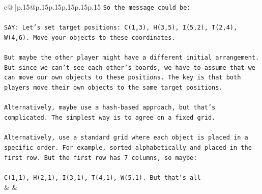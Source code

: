 \documentclass{article}
\begin{document}
{\begin{supertabular}{c@{$\;$}|p{.15\linewidth}@{}p{.15\linewidth}p{.15\linewidth}p{.15\linewidth}p{.15\linewidth}p{.15\linewidth}}
{{{\texttt{So the message could be:} \\
\\ 
\texttt{SAY: Let's set target positions: C(1,3), H(3,5), I(5,2), T(2,4), W(4,6). Move your objects to these coordinates.} \\
\\ 
\texttt{But maybe the other player might have a different initial arrangement. But since we can't see each other's boards, we have to assume that we can move our own objects to these positions. The key is that both players move their own objects to the same target positions.} \\
\\ 
\texttt{Alternatively, maybe use a hash{-}based approach, but that's complicated. The simplest way is to agree on a fixed grid.} \\
\\ 
\texttt{Alternatively, use a standard grid where each object is placed in a specific order. For example, sorted alphabetically and placed in the first row. But the first row has 7 columns, so maybe:} \\
\\ 
\texttt{C(1,1), H(2,1), I(3,1), T(4,1), W(5,1). But that's all} \\
            }
        }
    }
    & & \\ \\


\end{supertabular}}
\end{document}
